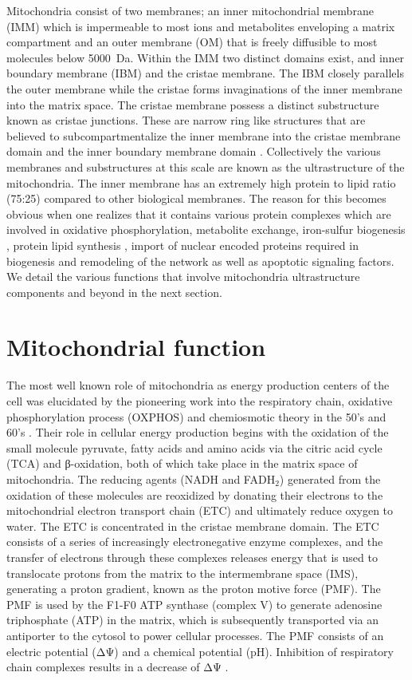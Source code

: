 Mitochondria consist of two membranes; an inner mitochondrial membrane (IMM) which is impermeable to most ions and metabolites enveloping a matrix compartment and an outer membrane (OM) that is freely diffusible to most molecules below \SI{5000}{\dalton}. Within the IMM two distinct domains exist, and inner boundary membrane (IBM) and the cristae membrane. The IBM closely parallels the outer membrane while the cristae forms invaginations of the inner membrane into the matrix space. The cristae membrane possess a distinct substructure known as cristae junctions. These are narrow ring like structures that are believed to subcompartmentalize the inner membrane into the cristae membrane domain and the inner boundary membrane domain \cite{mannella_topology_2001}. Collectively the various membranes and substructures at this scale are known as the ultrastructure of the mitochondria. The inner membrane has an extremely high protein to lipid ratio (75:25) compared to other biological membranes. The reason for this becomes obvious when one realizes that it contains various protein complexes which are involved in oxidative phosphorylation, metabolite exchange, iron-sulfur biogenesis \cite{veatch_mitochondrial_2009}, protein lipid synthesis \cite{osman_making_2011}, import of nuclear encoded proteins required in biogenesis \cite{schmidt_mitochondrial_2010} and remodeling of the network as well as apoptotic \cite{tait_mitochondria_2010} signaling factors. We detail the various functions that involve mitochondria ultrastructure components and beyond in the next section.
\section{Mitochondrial function}
The most well known role of mitochondria as energy production centers of the cell was elucidated by the pioneering work into the respiratory chain, oxidative phosphorylation process (OXPHOS) and chemiosmotic theory in the 50's and 60's \cite{chance_respiratory_1955,mitchell_coupling_1961}. Their role in cellular energy production begins with the oxidation of the small molecule pyruvate, fatty acids and amino acids via the citric acid cycle (TCA) and β-oxidation, both of which take place in the matrix space of mitochondria. The reducing agents (NADH and FADH$_2$) generated from the oxidation of these molecules are reoxidized by donating their electrons to the mitochondrial electron transport chain (ETC) and ultimately reduce oxygen to water. The ETC is concentrated in the cristae membrane domain. The ETC consists of a series of increasingly electronegative enzyme complexes, and the transfer of electrons through these complexes releases energy that is used to translocate protons from the matrix to the intermembrane space (IMS), generating a proton gradient, known as the proton motive force (PMF). The PMF is used by the F1-F0 ATP synthase (complex V) to generate adenosine triphosphate (ATP) in the matrix, which is subsequently transported via an antiporter to the cytosol to power cellular processes. The PMF consists of an electric potential (ΔΨ) and a chemical potential (pH). Inhibition of respiratory chain complexes results in a decrease of ΔΨ \cite{benard_ultrastructure_2008}.

